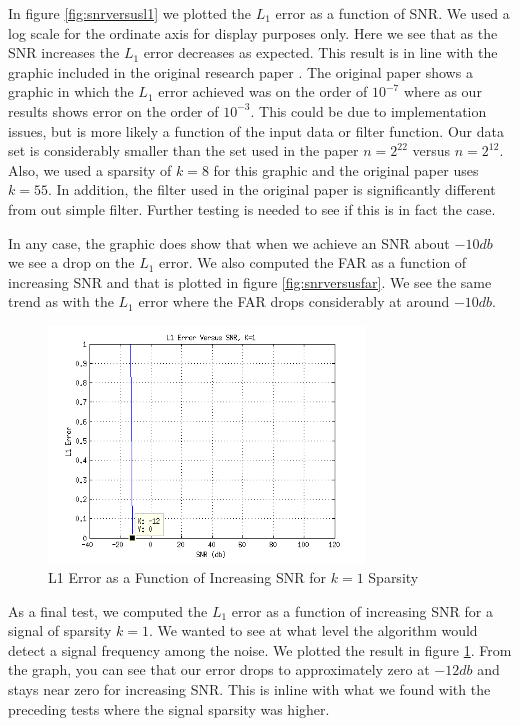 \documentclass[journal]{IEEEtran}
\begin{document}
\par In figure \ref{fig:snrversusl1} we plotted the \(L_1\) error as a function of SNR. We used a log scale for the ordinate axis for display purposes only. Here we see that as the SNR increases the \(L_1\) error decreases as expected. This result is in line with the graphic included in the original research paper \cite{hass}. The original paper shows a graphic in which the \(L_1\) error achieved was on the order of \(10^{-7}\) where as our results shows error on the order of \(10^{-3}\). This could be due to implementation issues, but is more likely a function of the input data or filter function. Our data set is considerably smaller than the set used in the paper \(n=2^{22}\) versus \(n=2^{12}\). Also, we used a sparsity of \(k=8\) for this graphic and the original paper uses \(k=55\). In addition, the filter used in the original paper is significantly different from out simple filter. Further testing is needed to see if this is in fact the case.

\par In any case, the graphic does show that when we achieve an SNR about \(-10db\) we see a drop on the \(L_1\) error. We also computed the FAR as a function of increasing SNR and that is plotted in figure \ref{fig:snrversusfar}. We see the same trend as with the \(L_1\) error where the FAR drops considerably at around \(-10db\).

\begin{figure}[h]
\centering
\includegraphics[width=3.3in]{../images/snrversusl1_k1.png}
\caption{L1 Error as a Function of Increasing SNR for \(k=1\) Sparsity}
\label{fig:snrversusl1_k1}
\end{figure}

\par As a final test, we computed the \(L_1\) error as a function of increasing SNR for a signal of sparsity \(k=1\). We wanted to see at what level the algorithm would detect a signal frequency among the noise. We plotted the result in figure \ref{fig:snrversusl1_k1}. From the graph, you can see that our error drops to approximately zero at \(-12db\) and stays near zero for increasing SNR. This is inline with what we found with the preceding tests where the signal sparsity was higher.
\end{document}
